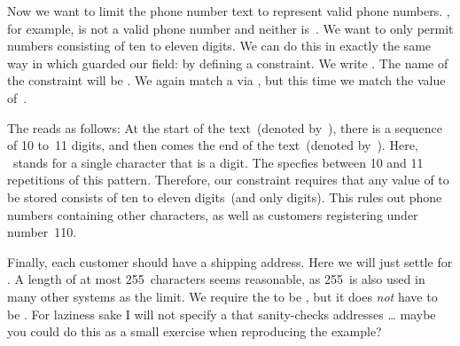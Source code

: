 Now we want to limit the phone number text to represent valid phone numbers.
, for example, is not a valid phone number and neither is~.
We want to only permit numbers consisting of ten to eleven digits.
We can do this in exactly the same way in which guarded our  field:
by defining a constraint.
We write \sqlIdx{\$}\sqlIdx{\textasciicircum}\sqlIdx{\textasciitilde}.
The name of the constraint will be .
We again match a  via \sqlIdx{\textasciitilde}\sqlil{\~}, but this time we match the value of~.

The  \sqlIdx{\$}\sqlIdx{\textasciicircum} reads as follows:
At the start of the text~(denoted by~\textil{\^}\sqlIdx{\textasciicircum}), there is a sequence of 10 to~11 digits, and then comes the end of the text~(denoted by~\textil{\$}\sqlIdx{\$}).
Here, \textil{\\d}\ stands for a single character that is a digit.
The  specfies between 10 and 11 repetitions of this pattern.
Therefore, our constraint requires that any value of  to be stored consists of ten to eleven digits~(and only digits).
This rules out phone numbers containing other characters, as well as customers registering under number~110.

Finally, each customer should have a shipping address.
Here we will just settle for .
A length of at most 255~characters seems reasonable, as 255~is also used in many other systems as the limit.
We require the  to be , but it does \emph{not} have to be .
For laziness sake I will not specify a  that sanity-checks addresses {\dots} maybe you could do this as a small exercise when reproducing the example?

